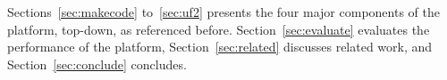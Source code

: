  
Sections~\ref{sec:makecode} to~\ref{sec:uf2} presents the four major components of the platform, top-down,
as referenced before. Section~\ref{sec:evaluate} evaluates the performance of the platform,
Section~\ref{sec:related} discusses related work, and Section~\ref{sec:conclude}
concludes.
